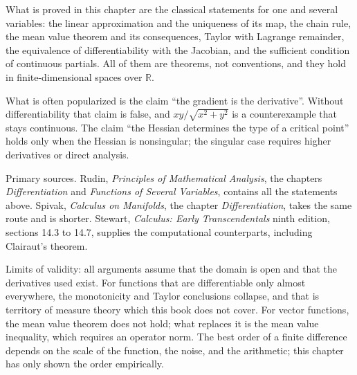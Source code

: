\begin{untukpeneliti}
What is proved in this chapter are the classical statements for one and several variables: the
linear approximation and the uniqueness of its map, the chain rule, the mean value theorem and
its consequences, Taylor with Lagrange remainder, the equivalence of differentiability with the
Jacobian, and the sufficient condition of continuous partials. All of them are theorems, not
conventions, and they hold in finite-dimensional spaces over $\mathbb{R}$.

What is often popularized is the claim ``the gradient is the derivative''. Without
differentiability that claim is false, and $xy/\sqrt{x^{2}+y^{2}}$ is a counterexample that
stays continuous. The claim ``the Hessian determines the type of a critical point'' holds only
when the Hessian is nonsingular; the singular case requires higher derivatives or direct
analysis.

Primary sources. Rudin, \emph{Principles of Mathematical Analysis}, the chapters
\emph{Differentiation} and \emph{Functions of Several Variables}, contains all the statements
above. Spivak, \emph{Calculus on Manifolds}, the chapter \emph{Differentiation}, takes the same
route and is shorter. Stewart, \emph{Calculus: Early Transcendentals} ninth edition, sections
14.3 to 14.7, supplies the computational counterparts, including Clairaut's theorem.

Limits of validity: all arguments assume that the domain is open and that the derivatives used
exist. For functions that are differentiable only almost everywhere, the monotonicity and
Taylor conclusions collapse, and that is territory of measure theory which this book does not
cover. For vector functions, the mean value theorem does not hold; what replaces it is the mean
value inequality, which requires an operator norm. The best order of a finite difference
depends on the scale of the function, the noise, and the arithmetic; this chapter has only
shown the order empirically.
\end{untukpeneliti}

